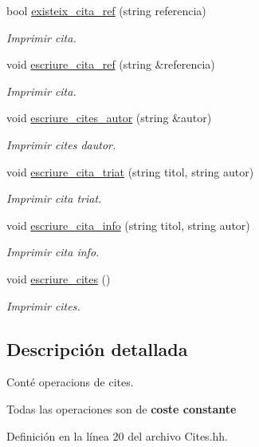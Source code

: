 \begin{DoxyCompactItemize}
bool \hyperlink{class_cites_ac80a9416a25f61d4a708ea13aad20da9}{existeix\+\_\+cita\+\_\+ref} (string referencia)
\begin{DoxyCompactList}\small\item\em Imprimir cita. \end{DoxyCompactList}\item 
void \hyperlink{class_cites_a91f8acd21c6867250f1ef4f4e4b32adb}{escriure\+\_\+cita\+\_\+ref} (string \&referencia)
\begin{DoxyCompactList}\small\item\em Imprimir cita. \end{DoxyCompactList}\item 
void \hyperlink{class_cites_a12ac50ed7017de796b3ce3b96df7d848}{escriure\+\_\+cites\+\_\+autor} (string \&autor)
\begin{DoxyCompactList}\small\item\em Imprimir cites d\textquotesingle{}autor. \end{DoxyCompactList}\item 
void \hyperlink{class_cites_ac692741811e35c8da2e92906d21cef07}{escriure\+\_\+cita\+\_\+triat} (string titol, string autor)
\begin{DoxyCompactList}\small\item\em Imprimir cita triat. \end{DoxyCompactList}\item 
void \hyperlink{class_cites_adf71af09037fa45f5cfd3095769f75a4}{escriure\+\_\+cita\+\_\+info} (string titol, string autor)
\begin{DoxyCompactList}\small\item\em Imprimir cita info. \end{DoxyCompactList}\item 
void \hyperlink{class_cites_a7cbdd378b53f56bc20dfa2f16e6be49e}{escriure\+\_\+cites} ()
\begin{DoxyCompactList}\small\item\em Imprimir cites. \end{DoxyCompactList}\end{DoxyCompactItemize}


\subsection{Descripción detallada}
Conté operacions de cites. 

Todas las operaciones son de {\bfseries coste constante} 

Definición en la línea 20 del archivo Cites.\+hh.



